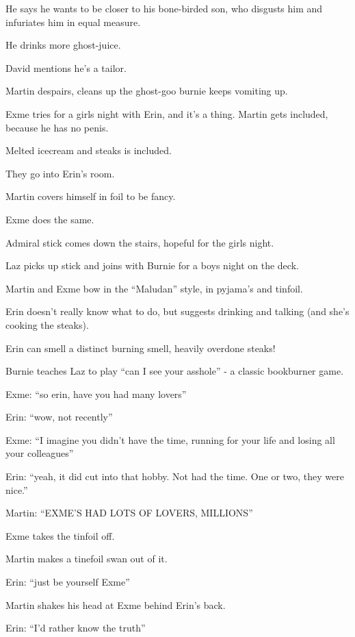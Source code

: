 He says he wants to be closer to his bone-birded son, who disgusts him and infuriates him in equal measure.\medskip

He drinks more ghost-juice.\medskip

David mentions he’s a tailor.\medskip

Martin despairs, cleans up the ghost-goo burnie keeps vomiting up.\medskip

Exme tries for a girls night with Erin, and it’s a thing. Martin gets included, because he has no penis.\medskip

Melted icecream and steaks is included.\medskip

They go into Erin’s room.\medskip

Martin covers himself in foil to be fancy.\medskip

Exme does the same.\medskip

Admiral stick comes down the stairs, hopeful for the girls night.\medskip

Laz picks up stick and joins with Burnie for a boys night on the deck.\medskip

Martin and Exme bow in the “Maludan” style, in pyjama’s and tinfoil.\medskip

Erin doesn’t really know what to do, but suggests drinking and talking (and she’s cooking the steaks).\medskip

Erin can smell a distinct burning smell, heavily overdone steaks!\medskip

Burnie teaches Laz to play “can I see your asshole” - a classic bookburner game.\medskip

Exme: “so erin, have you had many lovers”\medskip

Erin: “wow, not recently”\medskip

Exme: “I imagine you didn’t have the time, running for your life and losing all your colleagues”\medskip

Erin: “yeah, it did cut into that hobby. Not had the time. One or two, they were nice.”\medskip

Martin: “EXME’S HAD LOTS OF LOVERS, MILLIONS”\medskip

Exme takes the tinfoil off.\medskip

Martin makes a tinefoil swan out of it.\medskip

Erin: “just be yourself Exme”\medskip

Martin shakes his head at Exme behind Erin’s back.\medskip

Erin: “I’d rather know the truth”\medskip

